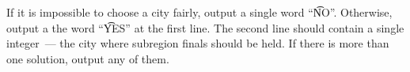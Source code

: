 If it is impossible to choose a city fairly, output a single word ``\t{NO}''. Otherwise, output a the word ``\t{YES}'' at the first line. The second line should contain a single integer~--- the city where subregion finals should be held. If there is more than one solution, output any of them.